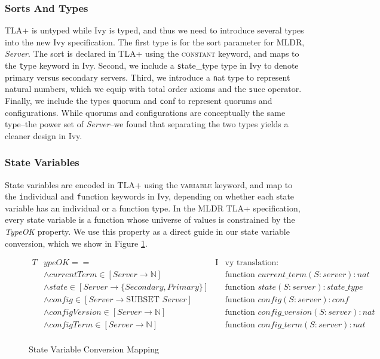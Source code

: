 \documentclass[runningheads]{llncs}
\newcommand{\tla}[1]{{\small\scshape #1}}
\newcommand{\ivy}[1]{{\texttt #1}}
\begin{document}
\subsubsection{Sorts And Types}

TLA+ is untyped while Ivy is typed, and thus we need to introduce several types into the new Ivy specification.  The first type is for the sort parameter for MLDR, \textit{Server}.  The sort is declared in TLA+ using the \tla{constant} keyword, and maps to the \ivy{type} keyword in Ivy.  Second, we include a \ivy{state\_type} type in Ivy to denote primary versus secondary servers.  Third, we introduce a \ivy{nat} type to represent natural numbers, which we equip with total order axioms and the \ivy{succ} operator.  Finally, we include the types \ivy{quorum} and \ivy{conf} to represent quorums and configurations.  While quorums and configurations are conceptually the same type--the power set of \textit{Server}--we found that separating the two types yields a cleaner design in Ivy.

\subsubsection{State Variables}

State variables are encoded in TLA+ using the \tla{variable} keyword, and map to the \ivy{individual} and \ivy{function} keywords in Ivy, depending on whether each state variable has an individual or a function type.  In the MLDR TLA+ specification, every state variable is a function whose universe of values is constrained by the \textit{TypeOK} property.  We use this property as a direct guide in our state variable conversion, which we show in Figure \ref{fig:statevar-map}.

\begin{figure}
  \begin{align*}
    T&ypeOK ==& \text{I}&\text{vy translation:}\\
      &\land currentTerm \in [Server \to \mathbb{N}]& &\text{function } current\_term(S:server) : nat\\
      &\land state \in [Server \to \{Secondary, Primary\}]& &\text{function } state(S:server) : state\_type\\
      &\land config \in [Server \to \text{SUBSET } Server]& &\text{function } config(S:server) : conf\\
      &\land configVersion \in [Server \to \mathbb{N}]& &\text{function } config\_version(S:server) : nat\\
      &\land configTerm \in [Server \to \mathbb{N}]& &\text{function } config\_term(S:server) : nat\\
  \end{align*}
  \caption{State Variable Conversion Mapping}
  \label{fig:statevar-map}
\end{figure}
\end{document}
